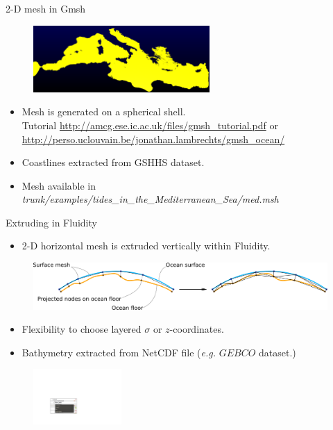 \documentclass[t]{beamer}
\begin{document}
\begin{frame}{2-D mesh in Gmsh}

\begin{figure}[htbp!]
 \centering
  \includegraphics[width=0.6\textwidth]{figures/med_mesh2}
\end{figure}
\begin{itemize}
\item Mesh is generated on a spherical shell.
\\ Tutorial {\footnotesize \url{http://amcg.ese.ic.ac.uk/files/gmsh\_tutorial.pdf}} or \\ {\footnotesize \url{http://perso.uclouvain.be/jonathan.lambrechts/gmsh_ocean/}}
\item Coastlines extracted from GSHHS dataset.
\item Mesh available in {\it trunk/examples/tides\_in\_the\_Mediterranean\_Sea/med.msh}
\end{itemize}

\end{frame}

\begin{frame}{Extruding in Fluidity}
\begin{itemize}
\item 2-D horizontal mesh is extruded vertically within Fluidity.
\end{itemize}
\begin{figure}[htbp!]
 \centering
  \includegraphics[width=1.0\textwidth]{figures/mesh_extrusion.png}
\end{figure}
\begin{itemize}
\item Flexibility to choose layered $\sigma$ or $z$-coordinates.
\item Bathymetry extracted from NetCDF file ({\it e.g.} $GEBCO$ dataset.)
\end{itemize}

\begin{figure}[htbp!]
 \centering
  \includegraphics[width=0.3\textwidth]{figures/extrude}
\end{figure}

\end{frame}
\end{document}
